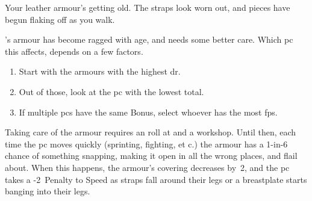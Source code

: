 \begin{boxtext}
  Your leather armour's getting old.
  The straps look worn out, and pieces have begun flaking off as you walk.
\end{boxtext}

's armour has become ragged with age, and needs some better care.
Which \gls{pc} this affects, depends on a few factors.

\begin{enumerate}
  \item
  Start with the \glspl{armour} with the highest \gls{dr}.
  \item
  Out of those, look at the \gls{pc} with the lowest  total.
  \item
  If multiple \glspl{pc} have the same Bonus, select whoever has the most \glspl{fp}.
\end{enumerate}

Taking care of the \gls{armour} requires an  roll at \tn[10] and a workshop.
Until then, each time the \gls{pc} moves quickly (sprinting, fighting, et c.) the armour has a 1-in-6 chance of something snapping, making it open in all the wrong places, and flail about.
When this happens, the \gls{armour}'s \gls{covering} decreases by~2, and the \gls{pc} takes a -2~Penalty to Speed as straps fall around their legs or a breastplate starts banging into their legs.
